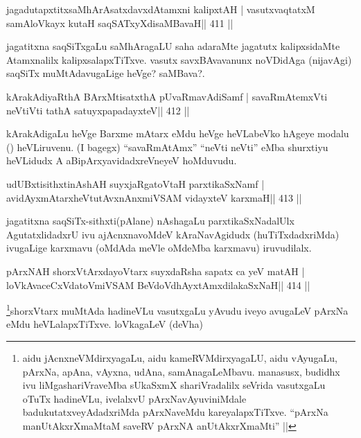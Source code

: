 \begin{shl}
jagadutapxtitxsaMhArAsatxdavxdAtamxni kalipxtAH |
vasutxvaqtatxM samAloVkayx kutaH saqSATxyXdisaMBavaH\hfill || 411 ||
\end{shl}

\begin{artha}
jagatitxna saqSiTxgaLu saMhAragaLU saha adaraMte jagatutx kalipxsidaMte  Atamxnalilx kalipxsalapxTiTxve. vasutx savxBAvavanunx noVDidAga (nijavAgi) saqSiTx muMtAdavugaLige heVge? saMBava?.
\end{artha}

\begin{shl}
kArakAdiyaRthA BArxMtisatxthA pUvaRmavAdiSamf |
savaRmAtemxVti neVtiVti tathA satuyxpapadayxteV\hfill || 412 ||
\end{shl}

\begin{artha}
kArakAdigaLu heVge Barxme mAtarx eMdu heVge heVLabeVko hAgeye modalu  (\quad) heVLiruvenu. (I bagegx) ``savaRmAtAmx'' ``neVti neVti'' eMba  shurxtiyu heVLidudx A aBipArxyavidadxreVneyeV hoMduvudu.
\end{artha}


\begin{shl}
udUBxtisithxtinAshAH suyxjaRgatoV\s taH parxtikaSxNamf |
avidAyxmAtarxheVtutAvxnAnxmiVSAM vidayxteV karxmaH\hfill || 413 ||
\end{shl}

\begin{artha}
jagatitxna saqSiTx-sithxti(pAlane) nAshagaLu parxtikaSxNadalUlx AgutatxlidadxrU ivu ajAcnxnavoMdeV kAraNavAgidudx (huTiTxdadxriMda) ivugaLige karxmavu (oMdAda meVle oMdeMba karxmavu) iruvudilalx.
\end{artha}


\begin{shl}
pArxNAH shorxVtArxdayoV\s tarx suyxdaRsha sapatx ca yeV matAH |
loVkAvaceCxVdatoV\s miVSAM BeVdoV\s dhAyxtAmxdilakaSxNaH\hfill || 414 ||
\end{shl}

\footnote[1]{aidu jAcnxneVMdirxyagaLu, aidu kameRVMdirxyagaLU, aidu 
vAyugaLu, pArxNa, apAna, vAyxna, udAna, samAnagaLeMbavu. manasusx, 
budidhx ivu liMgashariVraveMba sUkaSxmX shariVradalilx seVrida 
vasutxgaLu oTuTx hadineVLu, ivelalxvU pArxNavAyuviniMdale 
badukutatxveyAdadxriMda pArxNaveMdu kareyalapxTiTxve. ``pArxNa 
manUtAkxrXmaMtaM saveRV pArxNA anUtAkxrXmaMti'' ||}shorxVtarx muMtAda 
hadineVLu vasutxgaLu yAvudu iveyo avugaLeV pArxNa eMdu heVLalapxTiTxve. 
loVkagaLeV (deVha)

